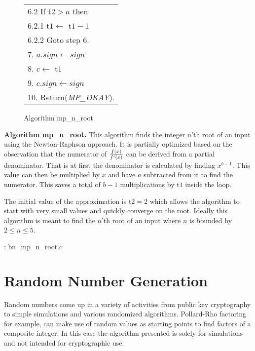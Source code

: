 \documentclass[b5paper]{book}
\begin{document}
\begin{figure}[!here]
\begin{small}
\begin{center}
\begin{tabular}{l}
\hspace{3mm}6.2  If t$2 > a$ then \\
\hspace{6mm}6.2.1  t$1 \leftarrow $ t$1 - 1$ \\
\hspace{6mm}6.2.2  Goto step 6. \\
7.  $a.sign \leftarrow sign$ \\
8.  $c \leftarrow $ t$1$ \\
9.  $c.sign \leftarrow sign$  \\
10.  Return(\textit{MP\_OKAY}).  \\
\hline
\end{tabular}
\end{center}
\end{small}
\caption{Algorithm mp\_n\_root}
\end{figure}
\textbf{Algorithm mp\_n\_root.}
This algorithm finds the integer $n$'th root of an input using the Newton-Raphson approach.  It is partially optimized based on the observation
that the numerator of ${f(x) \over f'(x)}$ can be derived from a partial denominator.  That is at first the denominator is calculated by finding
$x^{b - 1}$.  This value can then be multiplied by $x$ and have $a$ subtracted from it to find the numerator.  This saves a total of $b - 1$ 
multiplications by t$1$ inside the loop.  

The initial value of the approximation is t$2 = 2$ which allows the algorithm to start with very small values and quickly converge on the
root.  Ideally this algorithm is meant to find the $n$'th root of an input where $n$ is bounded by $2 \le n \le 5$.  

\vspace{+3mm}\begin{small}
\hspace{-5.1mm}{\bf File}: bn\_mp\_n\_root.c
\vspace{-3mm}
\begin{alltt}
\end{alltt}
\end{small}

\section{Random Number Generation}

Random numbers come up in a variety of activities from public key cryptography to simple simulations and various randomized algorithms.  Pollard-Rho 
factoring for example, can make use of random values as starting points to find factors of a composite integer.  In this case the algorithm presented
is solely for simulations and not intended for cryptographic use.  
\end{document}
